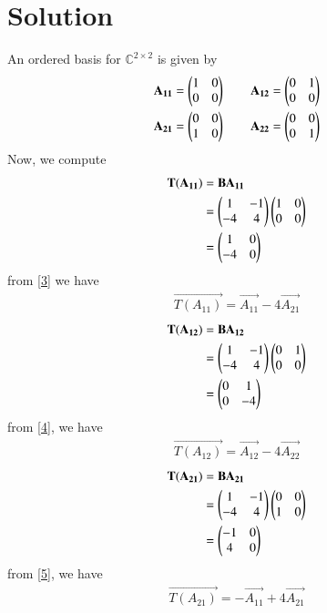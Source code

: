 \documentclass[journal,12pt,twocolumn]{IEEEtran}
\begin{document}
\section{Solution}
An ordered basis for $\mathbb{C}^{2\times2}$ is given by
\begin{align}
& \mathbf{A_{11}} = \begin{pmatrix}1 & 0 \\ 0 & 0\end{pmatrix} \qquad \mathbf{A_{12}} = \begin{pmatrix}0 & 1 \\ 0 & 0\end{pmatrix} \\
& \mathbf{A_{21}} = \begin{pmatrix}0 & 0 \\ 1 & 0\end{pmatrix} \qquad \mathbf{A_{22}} = \begin{pmatrix}0 & 0 \\ 0 & 1\end{pmatrix}
\end{align}
Now, we compute
\begin{align}  
\mathbf{T(A_{11})} & = \mathbf{BA_{11}} \\
                & = \begin{pmatrix}1 & -1 \\ -4 & 4\end{pmatrix}\begin{pmatrix}1 & 0 \\ 0 & 0\end{pmatrix} \\
                & = \begin{pmatrix}1 & 0 \\ -4 & 0\end{pmatrix} \label{3}
\end{align}
from \eqref{3} we have
\begin{align}
\vec{T(A_{11})} = \vec{A_{11}} -4\vec{A_{21}}\label{7}
\end{align}
\begin{align}  
	\mathbf{T(A_{12})} & = \mathbf{BA_{12}} \\
	& = \begin{pmatrix}1 & -1 \\ -4 & 4\end{pmatrix}\begin{pmatrix}0 & 1 \\ 0 & 0\end{pmatrix} \\
	& = \begin{pmatrix}0 & 1 \\ 0 & -4\end{pmatrix} \label{4}
\end{align}
from \eqref{4}, we have
\begin{align}
	\vec{T(A_{12})} = \vec{A_{12}} -4\vec{A_{22}}\label{8}
\end{align}
\begin{align}  
	\mathbf{T(A_{21})} & = \mathbf{BA_{21}} \\
	& = \begin{pmatrix}1 & -1 \\ -4 & 4\end{pmatrix}\begin{pmatrix}0 & 0 \\ 1 & 0\end{pmatrix} \\
	& = \begin{pmatrix}-1 & 0 \\ 4 & 0\end{pmatrix} \label{5}
\end{align}
from \eqref{5}, we have 
\begin{align}
	\vec{T(A_{21})} = -\vec{A_{11}} + 4\vec{A_{21}}\label{9}
\end{align}
\end{document}
